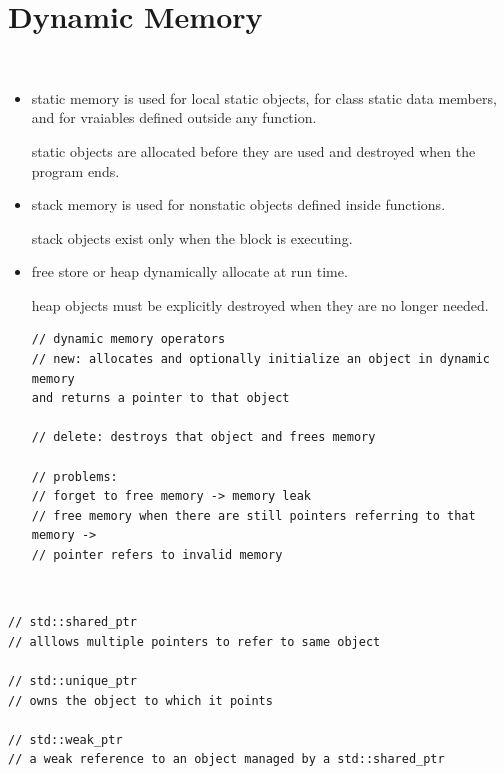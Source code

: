 \documentclass{blog}
\begin{document}
\section{Dynamic Memory}
\begin{definition}[memory]~
    \begin{itemize}
        \item static memory is used for local static objects, for class static data members,
              and for vraiables defined outside any function.

              static objects are allocated before they are used and destroyed when the program ends.
        \item stack memory is used for nonstatic objects defined inside functions.

              stack objects exist only when the block is executing.

        \item free store or heap dynamically allocate at run time.

              heap objects must be explicitly destroyed when they are no longer needed.
              \begin{verbatim}
// dynamic memory operators
// new: allocates and optionally initialize an object in dynamic memory
and returns a pointer to that object

// delete: destroys that object and frees memory

// problems:
// forget to free memory -> memory leak
// free memory when there are still pointers referring to that memory ->
// pointer refers to invalid memory
\end{verbatim}
    \end{itemize}
\end{definition}

\begin{definition}~
    \begin{verbatim}
// std::shared_ptr
// alllows multiple pointers to refer to same object

// std::unique_ptr
// owns the object to which it points

// std::weak_ptr
// a weak reference to an object managed by a std::shared_ptr
\end{verbatim}
\end{definition}
\end{document}
